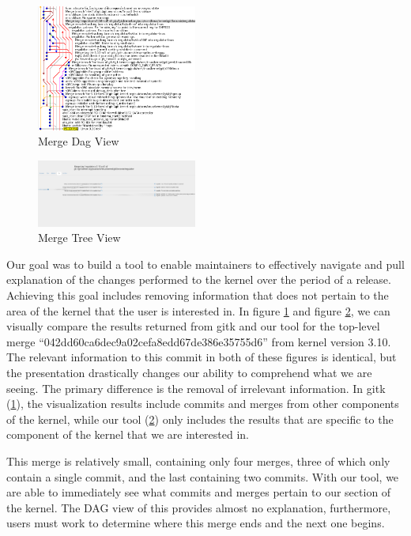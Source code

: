 \documentclass[conference, draftclsnofoot]{IEEEtran}
\begin{document}
\begin{figure}
        \centering
        \includegraphics[width=0.47\textwidth]{figures/042dd_DAG.png}
        \caption{Merge Dag View}
        \label{fig:dag_view}
\end{figure}

\begin{figure}
        \centering
        \includegraphics[width=0.47\textwidth]{figures/042dd_tree.png}
        \caption{Merge Tree View}
        \label{fig:tree_view}
\end{figure}

Our goal was to build a tool to enable maintainers to effectively navigate and pull
explanation of the changes performed to the kernel over the period of a release.
Achieving this goal includes removing information that does not pertain to the area
of the kernel that the user is interested in. In figure \ref{fig:dag_view} and
figure \ref{fig:tree_view}, we can visually compare the results returned from gitk
and our tool for the top-level merge ``042dd60ca6dec9a02cefa8edd67de386e35755d6''
from kernel version 3.10. The relevant information to this commit in both of these
figures is identical, but the presentation drastically changes our ability to
comprehend what we are seeing. The primary difference is the removal of irrelevant
information. In gitk (\ref{fig:dag_view}), the visualization results include commits
and merges from other components of the kernel, while our tool (\ref{fig:tree_view})
only includes the results that are specific to the component of the kernel that we
are interested in.

This merge is relatively small, containing only four merges, three of which
only contain a single commit, and the last containing two commits. With our
tool, we are able to immediately see what commits and merges pertain to our
section of the kernel. The DAG view of this provides almost no explanation,
furthermore, users must work to determine where this merge ends and the next one
begins.
\end{document}
